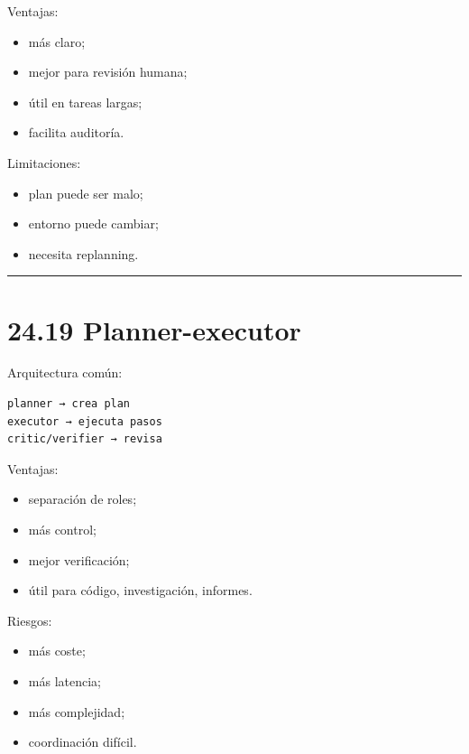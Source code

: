 Ventajas:

\begin{itemize}
\tightlist
\item
  más claro;
\item
  mejor para revisión humana;
\item
  útil en tareas largas;
\item
  facilita auditoría.
\end{itemize}

Limitaciones:

\begin{itemize}
\tightlist
\item
  plan puede ser malo;
\item
  entorno puede cambiar;
\item
  necesita replanning.
\end{itemize}

\begin{center}\rule{0.5\linewidth}{0.5pt}\end{center}

\section{24.19 Planner-executor}\label{planner-executor-1}

Arquitectura común:

\begin{lstlisting}
planner → crea plan
executor → ejecuta pasos
critic/verifier → revisa
\end{lstlisting}

Ventajas:

\begin{itemize}
\tightlist
\item
  separación de roles;
\item
  más control;
\item
  mejor verificación;
\item
  útil para código, investigación, informes.
\end{itemize}

Riesgos:

\begin{itemize}
\tightlist
\item
  más coste;
\item
  más latencia;
\item
  más complejidad;
\item
  coordinación difícil.
\end{itemize}

